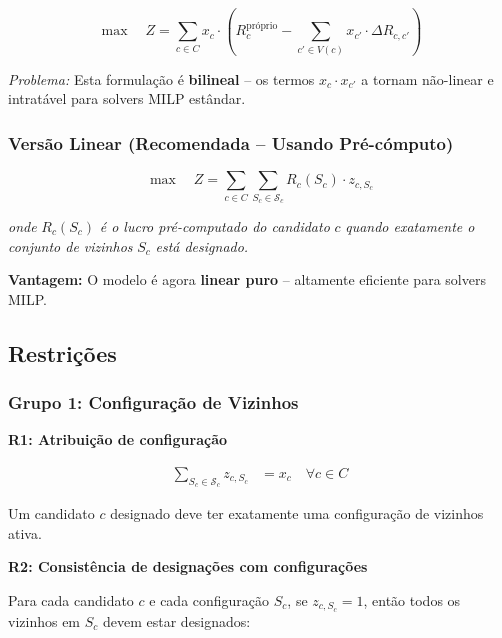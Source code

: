 \begin{equation}
\label{eq:objetivo_bilineal}
\max \quad Z = \sum_{c \in C} x_c \cdot \left( R_c^{\text{próprio}} - \sum_{c' \in V(c)} x_{c'} \cdot \Delta R_{c,c'} \right)
\end{equation}

\textit{Problema:} Esta formulação é \textbf{bilineal} -- os termos $x_c \cdot x_{c'}$ a tornam não-linear e intratável para solvers MILP estândar.

\subsubsection{Versão Linear (Recomendada -- Usando Pré-cómputo)}

\begin{equation}
\label{eq:objetivo_linear}
\max \quad Z = \sum_{c \in C} \sum_{S_c \in \mathcal{S}_c} R_c(S_c) \cdot z_{c,S_c}
\end{equation}

\textit{onde} $R_c(S_c)$ \textit{é o lucro pré-computado do candidato } $c$ \textit{ quando exatamente o conjunto de vizinhos } $S_c$ \textit{ está designado.}

\vspace{0.5cm}

\textbf{Vantagem:} O modelo é agora \textbf{linear puro} -- altamente eficiente para solvers MILP.

\subsection{Restrições}

\subsubsection{Grupo 1: Configuração de Vizinhos}

\hspace{0.5cm} \textbf{R1: Atribuição de configuração}

\begin{align}
\sum_{S_c \in \mathcal{S}_c} z_{c,S_c} &= x_c \quad \forall c \in C \label{eq:restricao_config}
\end{align}

Um candidato $c$ designado deve ter exatamente uma configuração de vizinhos ativa.

\hspace{0.5cm} \textbf{R2: Consistência de designações com configurações}

Para cada candidato $c$ e cada configuração $S_c$, se $z_{c,S_c} = 1$, então todos os vizinhos em $S_c$ devem estar designados:

